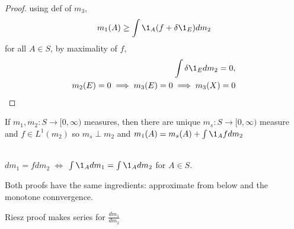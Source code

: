 \begin{proof}
	using def of $m_3$, 
	\begin{align*}
		m_1 (A) \geq \int \1_A (f + \delta \1_E ) d m_2
	\end{align*} 
	for all $A \in S$, by maximality of $f,$ 
	\begin{align*}
		\int \delta \1_E dm_2 = 0, \\
		m_2 (E) = 0 \implies m_3 (E) = 0 \implies m_3 (X) = 0
	\end{align*} 
\end{proof}



\begin{corollary}
	If $m_1, m_2 : S \to [0, \infty)$	 measures, then there are unique $m_s :S \to [0, \infty)$ measure and 
	$f \in L^{1} (m_2)$ so $m_s \perp m_2$ and $m_1 (A) = m_s (A) + \int \1_A f d m_2$
\end{corollary}

\begin{remark}[Notation] \\
	$d m_1 = f dm_2$ $\iff $ $\int \1_A d m_1 = \int \1_A d m_2$ for $A \in S$.
\end{remark}



\begin{remark}
	Both proofs have the same ingredients: approximate from below and the monotone connvergence.

	Riesz proof makes series for $\frac{d m_1}{d m_2}$
\end{remark}

